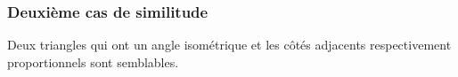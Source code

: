 \documentclass[a4paper,12pt]{article}
\begin{document}
\subsubsection{Deuxième cas de similitude}
\begin{theorem}
Deux triangles qui ont un angle isométrique et les côtés adjacents respectivement proportionnels sont semblables.
\end{theorem}
\end{document}
